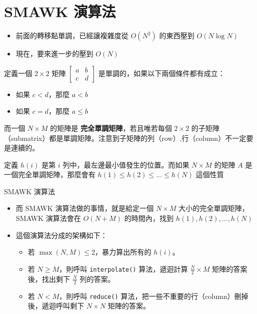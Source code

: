 \documentclass[standalone]{beamer}
\begin{document}
\section{SMAWK 演算法}

\begin{frame}{}
  \begin{itemize}
    \item 前面的轉移點單調，已經讓複雜度從 $O(N^2)$ 的東西壓到 $O(N \log N)$
    \item 現在，要來進一步的壓到 $O(N)$
  \end{itemize}
\end{frame}

\begin{frame}{}
  \begin{theorem}
    定義一個 $2 \times 2$ 矩陣 $\begin{bmatrix}
      a & b \\
      c & d
    \end{bmatrix}$ 是單調的，如果以下兩個條件都有成立：

    \begin{itemize}
      \item 如果 $c < d$，那麼 $a < b$
      \item 如果 $c = d$，那麼 $a \leq b$
    \end{itemize}

    而一個 $N \times M$ 的矩陣是 \textbf{完全單調矩陣}，若且唯若每個 $2 \times 2$ 的子矩陣（submatrix）都是單調矩陣。注意到子矩陣的列（row）,行（column）不一定要是連續的。
  \end{theorem}

  定義 $h(i)$ 是第 $i$ 列中，最左邊最小值發生的位置。而如果 $N \times M$ 的矩陣 $A$ 是一個完全單調矩陣，那麼會有 $h(1) \leq h(2) \leq \dots \leq h(N)$ 這個性質
\end{frame}

\begin{frame}{SMAWK 演算法}
  \begin{itemize}
    \item 而 SMAWK 演算法做的事情，就是給定一個 $N \times M$ 大小的完全單調矩陣，SMAWK 演算法會在 $O(N + M)$ 的時間內，找到 $h(1), h(2), \dots, h(N)$
    \item 這個演算法分成的架構如下：
    \begin{itemize}
      \item 若 $\max(N, M) \leq 2$，暴力算出所有的 $h(i)$。
      \item 若 $N \geq M$，則呼叫 \texttt{interpolate()} 算法，遞迴計算 $\frac{N}{2} \times M$ 矩陣的答案後，找出剩下 $\frac{N}{2}$ 列的答案。
      \item 若 $N < M$，則呼叫 \texttt{reduce()} 算法，把一些不重要的行（column）刪掉後，遞迴呼叫剩下 $N \times N$ 矩陣的答案。
    \end{itemize}
  \end{itemize}
\end{frame}
\end{document}

